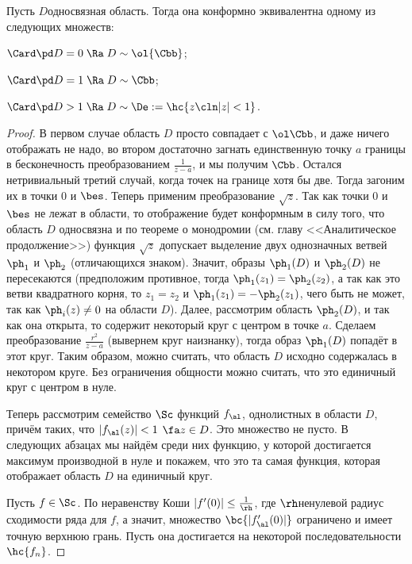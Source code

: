 \documentclass[a4paper]{article}
\begin{document}
\begin{theorem}
Пусть $D$\т односвязная область. Тогда она конформно эквивалентна одному из следующих множеств:
\begin{items}{-2}
\item $\Card \pd D = 0 \; \Ra \; D \sim \ol{\Cbb}$;
\item $\Card \pd D = 1 \; \Ra \; D \sim \Cbb$;
\item $\Card \pd D > 1 \; \Ra \; D \sim \De := \hc{z\cln |z|<1}$.
\end{items}
\end{theorem}
\begin{proof}
В первом случае область $D$ просто совпадает с $\ol\Cbb$, и даже ничего отображать не надо, во втором достаточно загнать
единственную точку $a$ границы в бесконечность преобразованием $\frac{1}{z-a}$, и мы получим $\Cbb$.
Остался нетривиальный третий случай, когда точек на границе хотя бы две. Тогда загоним их в точки $0$ и $\bes$.
Теперь применим преобразование $\sqrt{z}$. Так как точки $0$ и $\bes$ не лежат в области, то отображение будет конформным
в силу того, что область $D$ односвязна и по теореме о монодромии (см. главу <<Аналитическое продолжение>>) функция $\sqrt{z}$
допускает выделение двух однозначных ветвей $\ph_1$ и $\ph_2$ (отличающихся знаком). Значит, образы $\ph_1(D)$ и $\ph_2(D)$
не пересекаются (предположим противное, тогда $\ph_1(z_1)=\ph_2(z_2)$, а так как это ветви квадратного корня, то
$z_1=z_2$ и $\ph_1(z_1) = -\ph_2(z_1)$, чего быть не может, так как $\ph_i(z)\neq 0$ на области $D$).
Далее, рассмотрим область $\ph_2(D)$, и так как она открыта, то содержит некоторый круг с центром в точке $a$.
Сделаем преобразование $\frac{r^2}{z-a}$ (вывернем круг наизнанку), тогда образ $\ph_1(D)$ попадёт в этот круг.
Таким образом, можно считать, что область $D$ исходно содержалась
в некотором круге. Без ограничения общности можно считать, что это единичный круг с центром в нуле.

Теперь рассмотрим семейство $\Sc$ функций $f_\al$, однолистных в области $D$, причём  таких, что $|f_\al(z)| < 1$ $\fa z \in D$. Это множество не пусто. В следующих абзацах мы найдём среди них функцию, у которой достигается максимум производной в нуле и покажем, что это та самая функция, которая отображает область $D$ на единичный круг.

Пусть $f \in \Sc$. По неравенству Коши $|f'(0)| \le \frac{1}{\rh}$, где $\rh$\т ненулевой радиус
сходимости ряда для $f$, а значит, множество $\bc{|f_\al'(0)|}$ ограничено и имеет точную верхнюю грань. Пусть она достигается на некоторой последовательности $\hc{f_n}$.


\end{proof}
\end{document}
